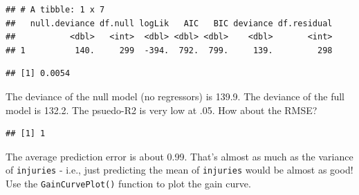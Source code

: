 \documentclass[
]{book}
\newenvironment{Shaded}{\begin{snugshade}}{\end{snugshade}}
\newcommand{\DataTypeTok}[1]{\textcolor[rgb]{0.13,0.29,0.53}{#1}}
\newcommand{\DecValTok}[1]{\textcolor[rgb]{0.00,0.00,0.81}{#1}}
\newcommand{\KeywordTok}[1]{\textcolor[rgb]{0.13,0.29,0.53}{\textbf{#1}}}
\newcommand{\NormalTok}[1]{#1}
\newcommand{\OperatorTok}[1]{\textcolor[rgb]{0.81,0.36,0.00}{\textbf{#1}}}
\newcommand{\StringTok}[1]{\textcolor[rgb]{0.31,0.60,0.02}{#1}}
\begin{document}
\begin{verbatim}
## # A tibble: 1 x 7
##   null.deviance df.null logLik   AIC   BIC deviance df.residual
##           <dbl>   <int>  <dbl> <dbl> <dbl>    <dbl>       <int>
## 1          140.     299  -394.  792.  799.     139.         298
\end{verbatim}

\begin{Shaded}
\end{Shaded}

\begin{verbatim}
## [1] 0.0054
\end{verbatim}

The deviance of the null model (no regressors) is 139.9. The deviance of the full model is 132.2. The psuedo-R2 is very low at .05. How about the RMSE?

\begin{Shaded}
\end{Shaded}

\begin{verbatim}
## [1] 1
\end{verbatim}

The average prediction error is about 0.99. That's almost as much as the variance of \texttt{injuries} - i.e., just predicting the mean of \texttt{injuries} would be almost as good! Use the \texttt{GainCurvePlot()} function to plot the gain curve.

\begin{Shaded}
\end{Shaded}
\end{document}
